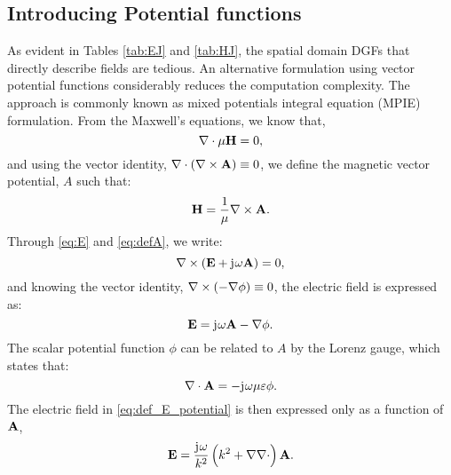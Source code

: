 \documentclass[12pt]{article}
\begin{document}
\subsection{Introducing Potential functions}
%
As evident in Tables \ref{tab:EJ} and \ref{tab:HJ}, the spatial domain DGFs that directly describe fields are tedious. An alternative formulation using vector potential functions considerably reduces the computation complexity. The approach is commonly known as mixed potentials integral equation (MPIE) formulation. From the Maxwell's equations, we know that,
%
\begin{equation}
  \nabla \cdot  \mu \mathbf{H} = 0,
  \label{eq:divergencless}
\end{equation}
%
and using the vector identity, $\nabla \cdot (\nabla \times \mathbf{A}) \equiv 0$, we define the magnetic vector potential, $A$ such that:
%
\begin{equation}
 \mathbf{H} = \frac{1}{\mu} \nabla \times \mathbf{A}.
 \label{eq:defA}
\end{equation}
%
Through \eqref{eq:E} and \eqref{eq:defA}, we write:
%
\begin{equation}
  \nabla \times (\mathbf{E} + \mathrm{j}\mkern1mu \omega \mathbf{A}) = 0,
  \label{eq:EandA}
\end{equation}
%
and knowing the vector identity, $\nabla \times (-\nabla \phi) \equiv 0$, the electric field is expressed as:
%
\begin{equation}
  \mathbf{E} = \mathrm{j}\mkern1mu \omega \mathbf{A} - \nabla \phi.
  \label{eq:def_E_potential}
\end{equation}
%
The scalar potential function $\phi$ can be related to $A$ by the Lorenz gauge, which states that:
%
\begin{equation}
  \nabla \cdot \mathbf{A} = -\mathrm{j}\mkern1mu \omega \mu \varepsilon \phi.
  \label{eq:Lorenz_gauge}
\end{equation}
%
The electric field in \eqref{eq:def_E_potential} is then expressed
only as a function of $\mathbf{A}$,
%
\begin{equation}
  \mathbf{E} = \frac{\mathrm{j}\mkern1mu \omega}{k^2}\left( k^2 + \nabla \nabla \cdot \right) \mathbf{A}.
  \label{eq:EinA}
\end{equation}
%
\end{document}

